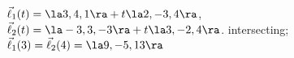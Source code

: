 {$\vec\ell_1(t) = \la 3,4,1\ra + t\la 2,-3,4\ra$,\\
$\vec\ell_2(t) = \la -3,3,-3\ra + t\la 3,-2,4\ra$.
}
{intersecting; $\vec\ell_1(3) = \vec\ell_2(4) = \la 9,-5,13\ra$
}

